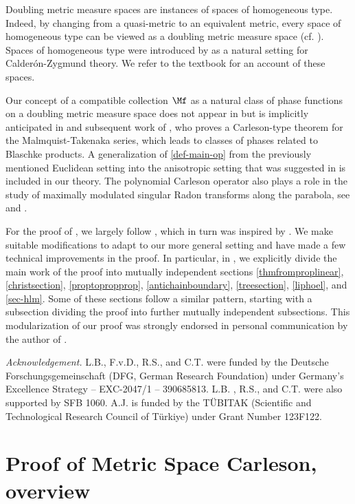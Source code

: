 Doubling metric measure spaces are instances of spaces of homogeneous type. Indeed, by changing from a quasi-metric to an equivalent metric, every space of homogeneous type can be viewed as a doubling metric measure space (cf. \cite{MaciasSegovia}). Spaces of homogeneous type were introduced by \cite{MR0499948} as a natural setting for Calder\'on-Zygmund theory. We refer to the textbook \cite{stein-book} for an account of these spaces.

Our concept of a compatible collection $\Mf$ as a natural class of phase functions on a doubling metric measure space does not appear in \cite{stein-book} but is implicitly anticipated in \cite{zk-polynomial} and subsequent work of \cite{mnatsakanyan}, who proves a Carleson-type theorem for the Malmquist-Takenaka series, which leads to classes of phases related to Blaschke products. A generalization of \eqref{def-main-op} from the previously mentioned Euclidean setting into the anisotropic setting that was suggested in \cite{zk-polynomial} is included in our theory. The polynomial Carleson operator also plays a role in the study of maximally modulated singular Radon transforms along the parabola, see \cite{ramos} and \cite{becker2024maximal}.

For the proof of , we largely follow \cite{zk-polynomial}, which in turn was inspired by \cite{lie-polynomial}. We make suitable modifications to adapt to our more general setting and have made a few technical improvements in the proof. In particular, in , we explicitly divide the main work of the proof into mutually independent sections \ref{thmfromproplinear}, \ref{christsection}, \ref{proptopropprop}, \ref{antichainboundary}, \ref{treesection}, \ref{liphoel}, and \ref{sec-hlm}. Some of these sections follow a similar pattern, starting with a subsection dividing the proof into further mutually independent subsections. This modularization of our proof was strongly endorsed in personal communication by the author of \cite{zk-polynomial}.

\noindent \textit{Acknowledgement.}
L.B., F.v.D., R.S., and C.T. were funded by the Deutsche Forschungsgemeinschaft (DFG, German Research Foundation) under Germany's Excellence Strategy -- EXC-2047/1 -- 390685813.
L.B. , R.S., and C.T. were also supported by SFB 1060.
A.J. is funded by the T\"UBITAK (Scientific and Technological Research Council of T\"urkiye) under Grant Number 123F122.

\chapter{Proof of Metric Space Carleson, overview}
\label{overviewsection}

